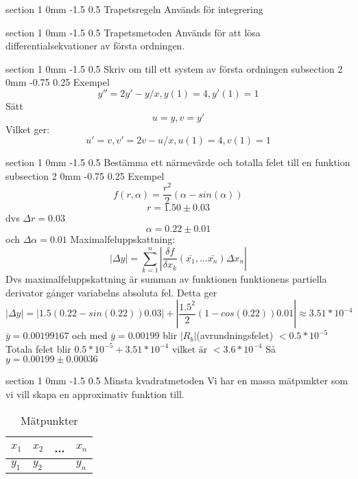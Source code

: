 \documentclass[a4paper,11pt]{article}
\makeatletter
\renewcommand{\section}{\@startsection
   {section}%
   {1}%
   {0mm}%
   {-1.5\baselineskip}%
   {0.5\baselineskip}%
   {\sffamily\bfseries\upshape\normalsize}}%
\renewcommand{\subsection}{\@startsection
   {subsection}%
   {2}%
   {0mm}%
   {-0.75\baselineskip}%
   {0.25\baselineskip}%
   {\rmfamily\normalfont\slshape\normalsize}}%
\makeatother
\begin{document}
\section{Trapetsregeln}
Används för integrering

\section{Trapetsmetoden}
Används för att lösa differentialsekvationer av första ordningen.

\section{Skriv om till ett system av första ordningen}
\subsection{Exempel}
$$y''=2y'-y/x,y(1)=4,y'(1)=1$$
Sätt
$$u=y,v=y'$$
Vilket ger:
$$u'=v, v'=2v-u/x,u(1)=4,v(1)=1$$	
$$$$

\section{Bestämma ett närmevärde och totalla felet till en funktion}
\subsection{Exempel}
$$f(r,\alpha)=\dfrac{r^2}{2}(\alpha-sin(\alpha))$$
$$r =1.50\pm 0.03$$
dvs $\Delta r=0.03$
$$\alpha=0.22\pm0.01$$
och $\Delta \alpha=0.01$
\newline
Maximalfeluppskattning:
$$|\Delta  y|=\sum_{k=1}^{n}|\dfrac{\delta f}{\delta x_k}(\bar{x_1},...\bar{x_n})\Delta x_n|$$
Dvs maximalfeluppskattning är summan av funktionen funktionens partiella derivator gånger variabelns absoluta fel.
\newline
Detta ger
$$|\Delta y|=|1.5(0.22-sin(0.22))0.03|+|\dfrac{1.5^2}{2}(1-cos(0.22))0.01|\approx 3.51*10^{-4}$$
$\bar{y}=0.00199167$ och med $\bar{y}=0.00199$ blir $|R_b|$(avrundningsfelet) $< 0.5*10^{-5}$ 
Totala felet blir $0.5*10^{-5}+3.51*10^{-4}\text{ vilket är }<3.6*10^{-4}$
Så $y=0.00199\pm 0.00036$

\section{Minsta kvadratmetoden}
Vi har en massa mätpunkter som vi vill skapa en approximativ funktion till.
\begin{table}[H]
  \centering
  \begin{tabular}{|l|l|l|l|}
    \hline
    $x_1$ & $x_2$  & ...  & $x_n$ \\ \hline
    $y_1$ &  $y_2$ &  & $y_n$ \\ \hline

  \end{tabular}
  \caption{Mätpunkter}
  \label{tab:funktion2}
\end{table}
\end{document}
